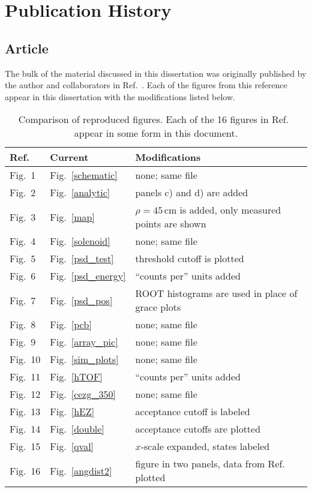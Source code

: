 \chapter{Publication History}
\section{Article}
\label{fig_notes}
The bulk of the material discussed in this dissertation was originally published by the author and collaborators in Ref.~\cite{Lighthall_2010}.  Each of the figures from this reference appear in this dissertation with the modifications listed below.
\renewcommand{\arraystretch}{1.3} %
\begin{table*}[ht]%
  \centering
  \begin{tabular}{lll}
    \hline
    Ref.~\cite{Lighthall_2010}&Current&Modifications\\
    \hline \hline
    Fig.~1&Fig.~\ref{schematic}&none; same file\\
    Fig.~2&Fig.~\ref{analytic}&panels c) and d) are added\\
    Fig.~3&Fig.~\ref{map}&$\rho=45$\,cm is added, only measured points are shown\\
    Fig.~4&Fig.~\ref{solenoid}&none; same file\\
    Fig.~5&Fig.~\ref{psd_test}&threshold cutoff is plotted\\
    Fig.~6&Fig.~\ref{psd_energy}&``counts per'' units added\\
    Fig.~7&Fig.~\ref{psd_pos}&ROOT histograms are used in place of grace plots\\
    Fig.~8&Fig.~\ref{pcb}&none; same file\\
    Fig.~9&Fig.~\ref{array_pic}&none; same file\\
    Fig.~10&Fig.~\ref{sim_plots}&none; same file\\
    Fig.~11&Fig.~\ref{hTOF}&``counts per'' units added\\
    Fig.~12&Fig.~\ref{cezg_350}&none; same file\\
    Fig.~13&Fig.~\ref{hEZ}&acceptance cutoff is labeled\\
    Fig.~14&Fig.~\ref{double}&acceptance cutoffs are plotted\\
    Fig.~15&Fig.~\ref{qval}&$x$-scale expanded, states labeled\\
    Fig.~16&Fig.~\ref{angdist2}&figure in two panels, data from Ref.~\cite{Mermaz_1971} plotted\\
    \hline
  \end{tabular}
  \caption[Comparison of reproduced figures.]{Comparison of reproduced figures.  Each of the 16 figures in Ref.~\cite{Lighthall_2010} appear in some form in this document.}
  \label{fig_corr}
\end{table*}

